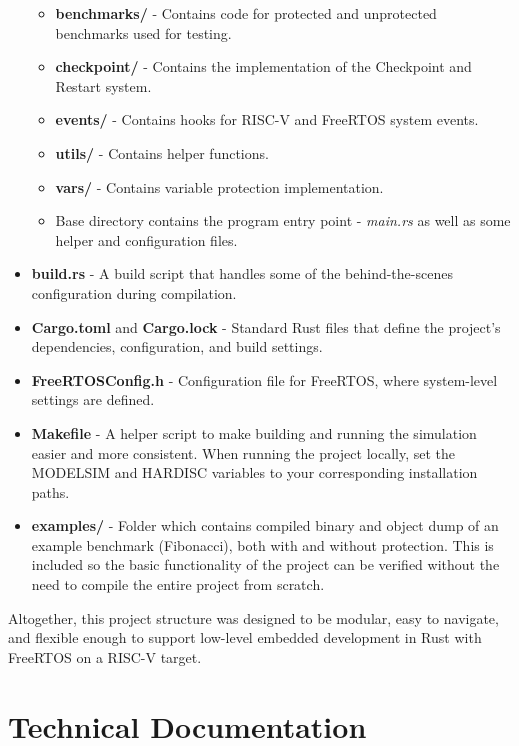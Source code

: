 \documentclass[12pt, letterpaper, slovak]{article}
\begin{document}
\begin{appendices}
\begin{itemize}
    \begin{itemize}
        \item \textbf{benchmarks/} - Contains code for protected and unprotected benchmarks used for testing.
        \item \textbf{checkpoint/} - Contains the implementation of the Checkpoint and Restart system.
        \item \textbf{events/} - Contains hooks for RISC-V and FreeRTOS system events.
        \item \textbf{utils/} - Contains helper functions.
        \item \textbf{vars/} - Contains variable protection implementation.
        \item Base directory contains the program entry point - \textit{main.rs} as well as some helper and configuration files.
    \end{itemize}
    
    \item \textbf{build.rs} - A build script that handles some of the behind-the-scenes configuration during compilation.
    
    \item \textbf{Cargo.toml} and \textbf{Cargo.lock} - Standard Rust files that define the project's dependencies, configuration, and build settings.
    
    \item \textbf{FreeRTOSConfig.h} - Configuration file for FreeRTOS, where system-level settings are defined.
    
    \item \textbf{Makefile} - A helper script to make building and running the simulation easier and more consistent.
    When running the project locally, set the MODELSIM and HARDISC variables to your corresponding installation paths.

    \item \textbf{examples/} - Folder which contains compiled binary and object dump of an example benchmark (Fibonacci), both with and without protection. This is included so the basic functionality of the project can be verified without the need to compile the entire project from scratch. 
\end{itemize}

Altogether, this project structure was designed to be modular, easy to navigate, and flexible enough to support low-level embedded development in Rust with FreeRTOS on a RISC-V target.


\clearpage
\section{Technical Documentation}


\end{appendices}
\end{document}
